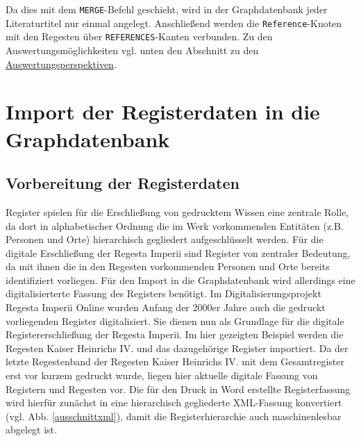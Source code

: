 \documentclass[ngerman,]{scrreprt}
\begin{document}
Da dies mit dem \texttt{MERGE}-Befehl geschieht, wird in der Graphdatenbank jeder Literaturtitel nur einmal angelegt. Anschließend werden die \texttt{Reference}-Knoten mit den Regesten über \texttt{REFERENCES}-Kanten verbunden. Zu den Auswertungsmöglichkeiten vgl. unten den Abschnitt zu den \protect\hyperlink{ux5cux23Auswertungsperspektiven}{Auswertungsperspektiven}.

\hypertarget{import-der-registerdaten-in-die-graphdatenbank}{%
\section{Import der Registerdaten in die Graphdatenbank}\label{import-der-registerdaten-in-die-graphdatenbank}}

\hypertarget{vorbereitung-der-registerdaten}{%
\subsection{Vorbereitung der Registerdaten}\label{vorbereitung-der-registerdaten}}

Register spielen für die Erschließung von gedrucktem Wissen eine zentrale Rolle, da dort in alphabetischer Ordnung die im Werk vorkommenden Entitäten (z.B. Personen und Orte) hierarchisch gegliedert aufgeschlüsselt werden. Für die digitale Erschließung der Regesta Imperii sind Register von zentraler Bedeutung, da mit ihnen die in den Regesten vorkommenden Personen und Orte bereits identifiziert vorliegen. Für den Import in die Graphdatenbank wird allerdings eine digitalisierterte Fassung des Registers benötigt. Im Digitalisierungsprojekt Regesta Imperii Online wurden Anfang der 2000er Jahre auch die gedruckt vorliegenden Register digitalisiert. Sie dienen nun als Grundlage für die digitale Registererschließung der Regesta Imperii. Im hier gezeigten Beispiel werden die Regesten Kaiser Heinrichs IV. und das dazugehörige Register importiert. Da der letzte Regestenband der Regesten Kaiser Heinrichs IV. mit dem Gesamtregister erst vor kurzem gedruckt wurde, liegen hier aktuelle digitale Fassung von Registern und Regesten vor. Die für den Druck in Word erstellte Registerfassung wird hierfür zunächst in eine hierarchisch gegliederte XML-Fassung konvertiert (vgl. Abb. \ref{ausschnittxml}), damit die Registerhierarchie auch maschinenlesbar abgelegt ist.
\end{document}

